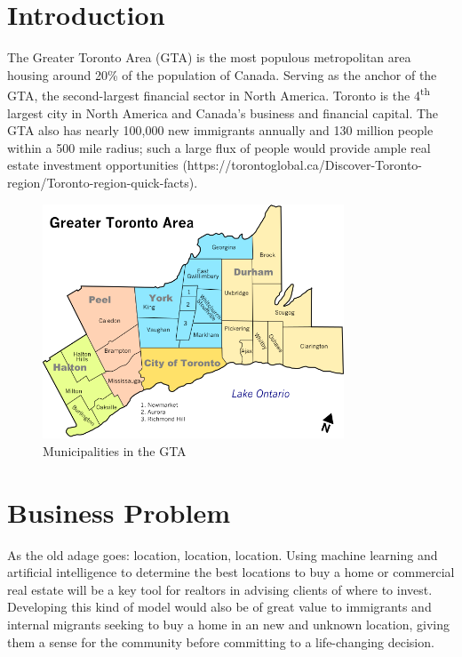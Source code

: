 \documentclass{article}
\begin{document}



\tableofcontents

\newpage

\section{Introduction}

The Greater Toronto Area (GTA) is the most populous metropolitan area housing around 20\% of the population of Canada. Serving as the anchor of the GTA, the second-largest financial sector in North America. Toronto is the 4\textsuperscript{th} largest city in North America and Canada's business and financial capital. The GTA also has nearly 100,000 new immigrants annually and 130 million people within a 500 mile radius; such a large flux of people would provide ample real estate investment opportunities (https://torontoglobal.ca/Discover-Toronto-region/Toronto-region-quick-facts).   

\begin{figure}[h]
	\centering
	\includegraphics[width=0.8\textwidth]{gta_map.png}
	\caption{Municipalities in the GTA}
	\label{gta}
\end{figure}


\section{Business Problem}

As the old adage goes: location, location, location. Using machine learning and artificial intelligence to determine the best locations to buy a home or commercial real estate will be a key tool for realtors in advising clients of where to invest. Developing this kind of model would also be of great value to immigrants and internal migrants seeking to buy a home in an new and unknown location, giving them a sense for the community before committing to a life-changing decision.
\end{document}
